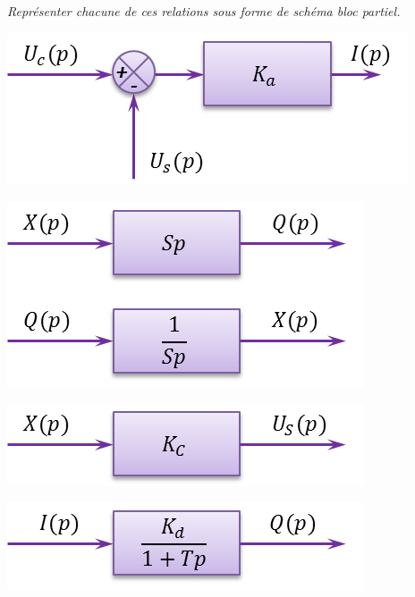\documentclass[10pt,fleqn]{article} %
\begin{document}
\begin{multicols}{2}
\subparagraph{}
\textit{Représenter chacune de ces relations sous forme de schéma bloc partiel.}
\ifprof
\begin{corrige}

\begin{minipage}[c]{.23\linewidth}
\begin{center}
\includegraphics[width=.95\linewidth]{images/bloc1}
\end{center}
\end{minipage}\hfill
\begin{minipage}[c]{.23\linewidth}
\begin{center}
\includegraphics[width=.95\linewidth]{images/bloc2}
\end{center}
\end{minipage}\hfill
\begin{minipage}[c]{.23\linewidth}
\begin{center}
\includegraphics[width=.95\linewidth]{images/bloc3}
\end{center}
\end{minipage}\hfill
\begin{minipage}[c]{.23\linewidth}
\begin{center}
\includegraphics[width=.95\linewidth]{images/bloc4}
\end{center}
\end{minipage}



\end{corrige}
\end{multicols}
\end{document}
